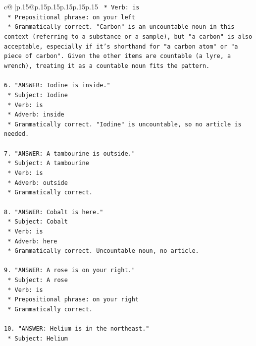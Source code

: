 \documentclass{article}
\begin{document}
{\begin{supertabular}{c@{$\;$}|p{.15\linewidth}@{}p{.15\linewidth}p{.15\linewidth}p{.15\linewidth}p{.15\linewidth}p{.15\linewidth}}
{{{\texttt{    *   Verb: is} \\
\texttt{    *   Prepositional phrase: on your left} \\
\texttt{    *   Grammatically correct. "Carbon" is an uncountable noun in this context (referring to a substance or a sample), but "a carbon" is also acceptable, especially if it's shorthand for "a carbon atom" or "a piece of carbon". Given the other items are countable (a lyre, a wrench), treating it as a countable noun fits the pattern.} \\
\\ 
\texttt{6.  "ANSWER: Iodine is inside."} \\
\texttt{    *   Subject: Iodine} \\
\texttt{    *   Verb: is} \\
\texttt{    *   Adverb: inside} \\
\texttt{    *   Grammatically correct. "Iodine" is uncountable, so no article is needed.} \\
\\ 
\texttt{7.  "ANSWER: A tambourine is outside."} \\
\texttt{    *   Subject: A tambourine} \\
\texttt{    *   Verb: is} \\
\texttt{    *   Adverb: outside} \\
\texttt{    *   Grammatically correct.} \\
\\ 
\texttt{8.  "ANSWER: Cobalt is here."} \\
\texttt{    *   Subject: Cobalt} \\
\texttt{    *   Verb: is} \\
\texttt{    *   Adverb: here} \\
\texttt{    *   Grammatically correct. Uncountable noun, no article.} \\
\\ 
\texttt{9.  "ANSWER: A rose is on your right."} \\
\texttt{    *   Subject: A rose} \\
\texttt{    *   Verb: is} \\
\texttt{    *   Prepositional phrase: on your right} \\
\texttt{    *   Grammatically correct.} \\
\\ 
\texttt{10. "ANSWER: Helium is in the northeast."} \\
\texttt{    *   Subject: Helium} \\
}}}
\end{supertabular}}
\end{document}
